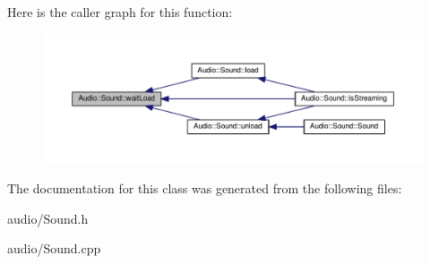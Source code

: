 Here is the caller graph for this function\+:
\nopagebreak
\begin{figure}[H]
\begin{center}
\leavevmode
\includegraphics[width=350pt]{de/d2d/classAudio_1_1Sound_aa18c8b54b681491a6346d6df9405c752_icgraph}
\end{center}
\end{figure}




The documentation for this class was generated from the following files\+:\begin{DoxyCompactItemize}
\item 
audio/Sound.\+h\item 
audio/Sound.\+cpp\end{DoxyCompactItemize}
